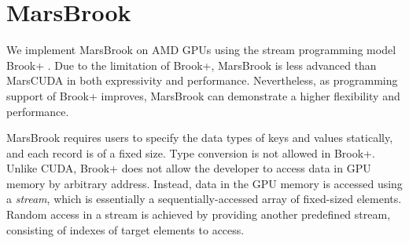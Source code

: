 %
%

\section{MarsBrook} \label{sec-brook}
We implement MarsBrook on AMD GPUs using the stream programming
model Brook+ \cite{BROOKPLUS}.
Due to the limitation of Brook+, MarsBrook is less advanced than MarsCUDA in both expressivity and performance.
Nevertheless, as programming support of Brook+ improves, MarsBrook can demonstrate a higher flexibility and performance.

MarsBrook requires users to specify the data types of keys and values statically, and each record is of a fixed size.
Type conversion is not allowed in Brook+. Unlike CUDA, Brook+ does not allow the developer to access data in GPU memory by arbitrary address.
Instead, data in the GPU memory is accessed using a {\em stream}, which is essentially a sequentially-accessed array of fixed-sized elements. Random access in a stream is achieved by providing another predefined stream, consisting of indexes of target elements to access.

